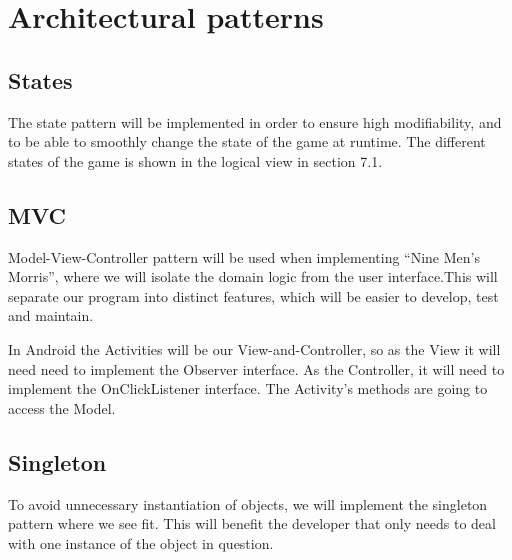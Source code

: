 \section{Architectural patterns}

\subsection{States}
The state pattern will be implemented in order to ensure high modifiability, and to be able to smoothly change the state of the game at runtime. The different states of the game is shown in the logical view in section 7.1.

\subsection{MVC}
Model-View-Controller pattern will be used when implementing “Nine Men’s Morris”, where we will isolate the domain logic from the user interface.This will separate our program into distinct features, which will be easier to develop, test and maintain.

In Android the Activities will be our View-and-Controller, so as the View it will need need to implement the Observer interface. As the Controller, it will need to implement the OnClickListener interface. The Activity’s methods are going to access the Model.

\subsection{Singleton}
To avoid unnecessary instantiation of objects, we will implement the singleton pattern where we see fit. This will benefit the developer that only needs to deal with one instance of the object in question.





